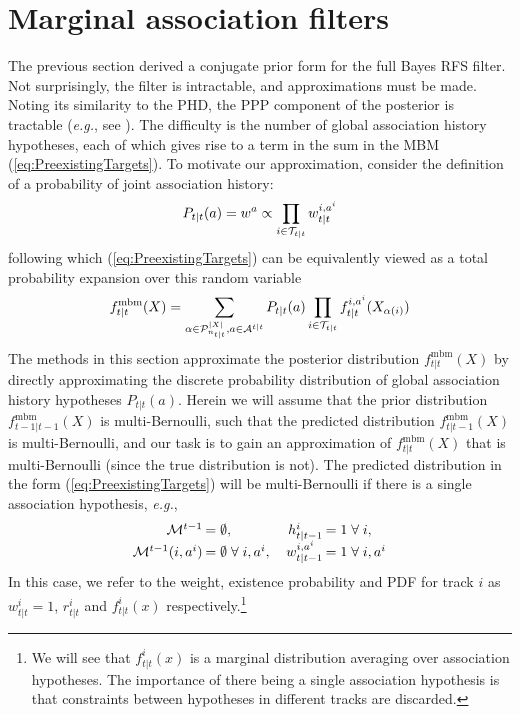 \documentclass[journal,twoside]{IEEEtran}
\theoremstyle{plain}
\begin{document}
\section{Marginal association filters}
\label{sec:Filters}
%
The previous section derived a conjugate prior form for the full Bayes RFS filter. Not surprisingly, the filter is intractable, and approximations must be made. Noting its similarity to the PHD, the PPP component of the posterior is tractable (\textit{e.g.}\xspace, see \cite{Wil12F2}). The difficulty is the number of global association history hypotheses, each of which gives rise to a term in the sum in the MBM (\ref{eq:PreexistingTargets}). To motivate our approximation, consider the definition of a probability of joint association history:
%
\begin{equation}\label{eq:JointAssocProb}
P_{t|t}(a) = w^a \propto \prod_{i\in{\cal T}_{t|t}}w_{t|t}^{i,a^i}
\end{equation}
%
following which (\ref{eq:PreexistingTargets}) can be equivalently viewed as a total probability expansion over this random variable
%
\begin{equation}
f^\mathrm{mbm}_{t|t}(X) = \sum_{\alpha\in{\cal P}_{n_{t|t}}^{|X|},a\in{\cal A}^{t|t}} P_{t|t}(a) \prod_{i\in{\cal T}_{t|t}}f_{t|t}^{i,a^i}(X_{\alpha(i)}) 
\label{eq:LCMBIndepApprox}
\end{equation}
%
The methods in this section approximate the posterior distribution $f^\mathrm{mbm}_{t|t}(X)$ by directly approximating the discrete probability distribution of global association history hypotheses $P_{t|t}(a)$. Herein we will assume that the prior distribution $f^\mathrm{mbm}_{t-1|t-1}(X)$ is multi-Bernoulli, such that the predicted distribution $f^\mathrm{mbm}_{t|t-1}(X)$ is multi-Bernoulli, and our task is to gain an approximation of $f^\mathrm{mbm}_{t|t}(X)$ that is multi-Bernoulli (since the true distribution is not). The predicted distribution in the form (\ref{eq:PreexistingTargets}) will be multi-Bernoulli if there is a single association hypothesis, \textit{e.g.}\xspace, 
%
\begin{equation}\label{eq:MultiBernoulliAssumption}
\renewcommand{\arraycolsep}{1pt}
\begin{array}{rlrl}
{\cal M}^{t-1} &= \emptyset, & h_{t|t-1}^i &= 1\;\forall\;i, \\
{\cal M}^{t-1}(i,a^i) &= \emptyset\;\forall\;i,a^i,\quad & w_{t|t-1}^{i,a^i} &= 1\;\forall\;i,a^i 
\end{array}
\end{equation}
%
In this case, we refer to the weight, existence probability and PDF for track $i$ as $w^i_{t|t}=1$, $r^i_{t|t}$ and $f^i_{t|t}(x)$ respectively.\footnote{We will see that $f^i_{t|t}(x)$ is a marginal distribution averaging over association hypotheses. The importance of there being a single association hypothesis is that constraints between hypotheses in different tracks are discarded.}
\end{document}
